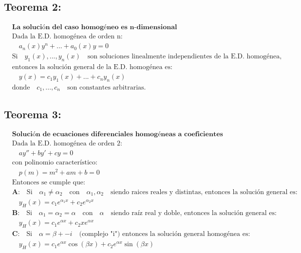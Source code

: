 \documentclass[a4paper,12pt,numbers=noenddot]{scrreprt}
\begin{document}
\subsection*{Teorema 2:}
\begin{align*}
    &\textbf{La solución del caso homogéneo es n-dimensional}\\
    &\text{Dada la E.D. homogénea de orden n:}\\
    &\quad a_n(x)y^{n}+...+a_0(x)y = 0\\
    &\text{Si} \quad y_1(x),...,y_n(x) \quad \text{son soluciones linealmente independientes de la E.D. homogénea,}\\
    &\text{entonces la solución general de la E.D. homogénea es:}\\
    &\quad y(x) = c_1y_1(x)+...+c_ny_n(x)\\
    &\text{donde} \quad c_1,...,c_n \quad \text{son constantes arbitrarias.}
\end{align*}

\subsection*{Teorema 3:}
\begin{align*}
    &\textbf{Solución de ecuaciones diferenciales homogéneas a coeficientes constantes}\\
    &\text{Dada la E.D. homogénea de orden 2:}\\
    &\quad a y'' + b y' + c y = 0\\
    &\text{con polinomio característico:}\\
    &\quad p(m) = m^2 + am + b = 0\\
    &\text{Entonces se cumple que:}\\
    &\textbf{A:} \quad \text{Si} \quad \alpha_1 \not = \alpha_2 \quad \text{con} \quad \alpha_1, \alpha_2 \quad \text{siendo raices reales y distintas,  entonces la solución general es:}\\
    &\quad y_H(x) = c_1e^{\alpha_1 x} + c_2e^{\alpha_2 x}\\
    &\textbf{B:} \quad \text{Si} \quad \alpha_1 = \alpha_2 = \alpha \quad \text{con} \quad \alpha \quad \text{siendo raíz real y doble, entonces la solución general es:}\\
    &\quad y_H(x) = c_1e^{\alpha x} + c_2xe^{\alpha x}\\
    &\textbf{C:} \quad \text{Si} \quad \alpha = \beta +- i \quad \text{(complejo "i") entonces la solución general homogénea es:}\\
    &\quad y_H(x) = c_1 e^{\alpha x} \cos (\beta x) + c_2 e^{\alpha x} \sin (\beta x)
\end{align*}
\end{document}
